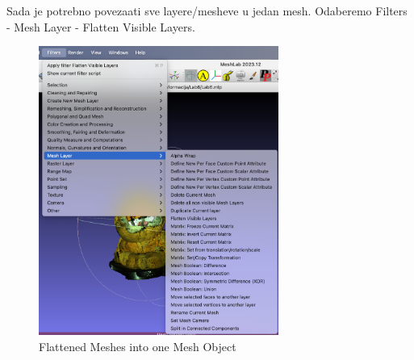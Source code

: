 \documentclass[12pt]{article} %
\begin{document}
		Sada je potrebno povezaati sve layere/mesheve u jedan mesh.
		Odaberemo Filters - Mesh Layer - Flatten Visible Layers.
		
		\begin{figure}[H]
			\centering
			\includegraphics[width=0.7\textwidth]{screenshots/17.png}
			\caption{Flattened Meshes into one Mesh Object}
			\label{fig:yourlabel}
		\end{figure}
\end{document}
